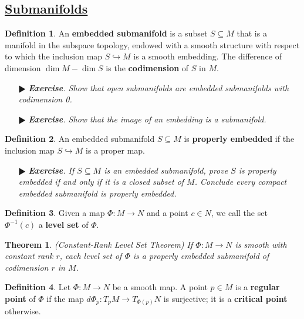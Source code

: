 \documentclass[11pt]{amsart}
\newtheorem*{theorem*}{Theorem}
\theoremstyle{definition}
\newtheorem*{definition*}{Definition}
\renewcommand\:{\colon}
\newcommand{\1}{\mathds{1}}
\newcommand{\exc}[1]{\vspace{-2.5pt}\begin{itemize}[leftmargin=15pt]\item[$\RHD$] \textit{\textbf{Exercise}. #1}\end{itemize}}
\begin{document}
\begin{center}
\end{center}



\subsection*{\underline{Submanifolds}}

\begin{definition*}
	An \textbf{embedded submanifold} is a subset $S \subseteq M$ that is a manifold in the subspace topology, endowed with a smooth structure with respect to which the inclusion map $S \hookrightarrow M$ is a smooth embedding. The difference of dimension $\dim M - \dim S$ is the \textbf{codimension} of $S$ in $M$.
\end{definition*}

\exc{Show that open submanifolds are embedded submanifolds with codimension 0.}
\exc{Show that the image of an embedding is a submanifold.}

\begin{definition*}
	An embedded submanifold $S \subseteq M$ is \textbf{properly embedded} if the inclusion map $S \hookrightarrow M$ is a proper map.
\end{definition*}

\exc{If $S \subseteq M$ is an embedded submanifold, prove $S$ is properly embedded if and only if it is a closed subset of $M$. Conclude every compact embedded submanifold is properly embedded.}

\begin{definition*}
	Given a map $\Phi\: M \to N$ and a point $c \in N$, we call the set $\Phi^{-1}(c)$ a \textbf{level set} of $\Phi$.
\end{definition*}

\begin{theorem*}
	\textnormal{(Constant-Rank Level Set Theorem)} If $\Phi\: M \to N$ is smooth with constant rank $r$, each level set of $\Phi$ is a properly embedded submanifold of codimension $r$ in $M$.
\end{theorem*}

\begin{definition*}
	Let $\Phi\: M \to N$ be a smooth map. A point $p \in M$ is a \textbf{regular point} of $\Phi$ if the map $d\Phi_p\: T_pM \to T_{\Phi(p)}N$ is surjective; it is a \textbf{critical point} otherwise.
\end{definition*}
\end{document}
